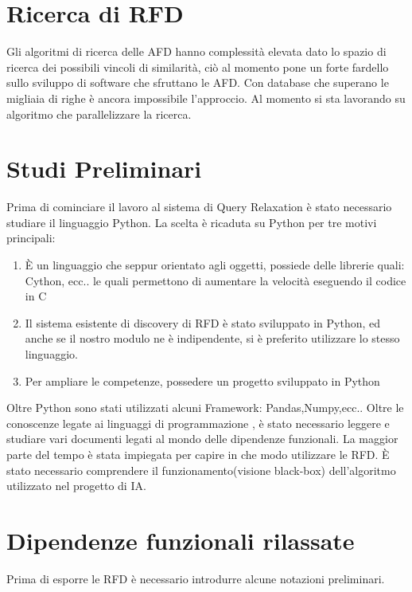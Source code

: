 \section{Ricerca di RFD}
Gli algoritmi di ricerca delle AFD hanno complessità elevata dato lo spazio di ricerca dei possibili vincoli di similarità, ciò al momento pone un forte fardello sullo sviluppo di software che sfruttano le AFD. Con database che superano le migliaia di righe è ancora impossibile l’approccio. Al momento si sta lavorando su algoritmo che parallelizzare la ricerca.


\section{Studi Preliminari}
Prima di cominciare il lavoro al sistema di Query Relaxation è stato necessario studiare il linguaggio Python.
La scelta è ricaduta su Python per tre motivi principali:
\begin{enumerate}
    \item È un linguaggio che seppur orientato agli oggetti, possiede delle librerie quali: Cython, ecc.. le quali permettono di aumentare la velocità eseguendo il codice in C
    \item Il sistema esistente di discovery di RFD è stato sviluppato in Python, ed anche se il nostro modulo ne è indipendente, si è preferito utilizzare lo stesso linguaggio.
    \item Per ampliare le competenze, possedere un progetto sviluppato in Python 
\end{enumerate}

Oltre Python sono stati utilizzati alcuni Framework: Pandas,Numpy,ecc..
Oltre le conoscenze legate ai linguaggi di programmazione , è stato necessario leggere e studiare vari documenti legati al mondo delle dipendenze funzionali. La maggior parte del tempo è stata impiegata per capire in che modo utilizzare le RFD. 
È stato necessario comprendere il funzionamento(visione black-box) dell’algoritmo utilizzato nel progetto di IA. 

\section{Dipendenze funzionali rilassate}
Prima di esporre le RFD è necessario introdurre alcune notazioni preliminari.

